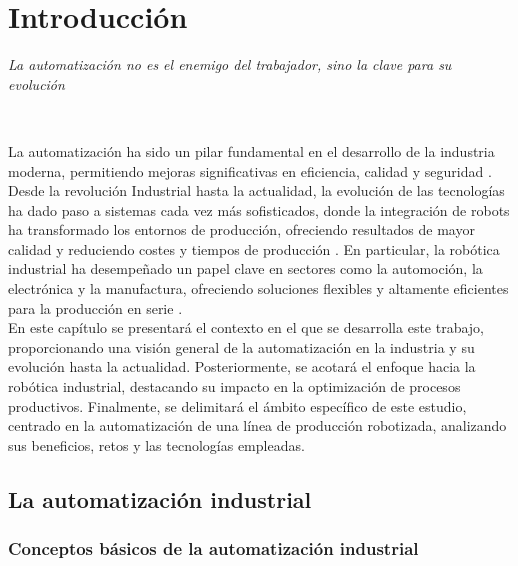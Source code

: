 \chapter{Introducción}
\label{cap:capitulo1}
\setcounter{page}{1}

\begin{flushright}
\begin{minipage}[]{10cm}
\emph{La automatización no es el enemigo del trabajador, sino la clave para su evolución}\\
\end{minipage}\\
\end{flushright}

\vspace{1cm}

La automatización ha sido un pilar fundamental en el desarrollo de la industria moderna, permitiendo mejoras significativas en eficiencia, calidad y seguridad \cite{definicion_2}. Desde la revolución Industrial hasta la actualidad, la evolución de las tecnologías ha dado paso a sistemas cada vez más sofisticados, donde la integración de robots ha transformado los entornos de producción, ofreciendo resultados de mayor calidad y reduciendo costes y tiempos de producción \cite{definicion_2}. En particular, la robótica industrial ha desempeñado un papel clave en sectores como la automoción, la electrónica y la manufactura, ofreciendo soluciones flexibles y altamente eficientes para la producción en serie \cite{definicion_2}.\\

En este capítulo se presentará el contexto en el que se desarrolla este trabajo, proporcionando una visión general de la automatización en la industria y su evolución hasta la actualidad. Posteriormente, se acotará el enfoque hacia la robótica industrial, destacando su impacto en la optimización de procesos productivos. Finalmente, se delimitará el ámbito específico de este estudio, centrado en la automatización de una línea de producción robotizada, analizando sus beneficios, retos y las tecnologías empleadas.

\section{La automatización industrial}
\label{sec:primeraseccion} %

\subsection{Conceptos básicos de la automatización industrial}

